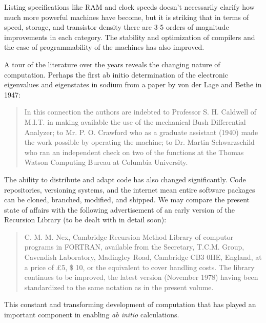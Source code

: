 Listing specifications like RAM and clock speeds doesn't necessarily clarify 
how much more powerful machines have become, 
but it is striking that in terms of speed, storage, and transistor density 
there are 3-5 orders of magnitude improvements in each category. 
The stability and optimization of compilers and the ease of programmability
of the machines has also improved.

A tour of the literature over the years reveals the changing nature of computation.
Perhaps the first ab initio determination of the electronic eigenvalues and eigenstates
in sodium from a paper by von der Lage and Bethe in 1947:
%
\begin{quote}
In this connection the authors are indebted to Professor S. H. Caldwell of M.I.T. in making available the
use of the mechanical Bush Differential Analyzer; to Mr. P. O. Crawford who as a graduate assistant (1940)
made the work possible by operating the machine; to Dr. Martin Schwarzschild who ran an independent
check on two of the functions at the Thomas Watson Computing Bureau at Columbia University.
\end{quote}
%


The ability to distribute and adapt code has also changed significantly. 
Code repositories, versioning systems, and the internet mean entire software
packages can be cloned, branched, modified, and shipped. We may compare the
present state of affairs with the following advertisement of an early version
of the Recursion Library (to be dealt with in detail soon):

\begin{quote}
C. M. M. Nex, Cambridge Recursion Method Library of computor
programs in FORTRAN, available from the Secretary, T.C.M. Group,
Cavendish Laboratory, Madingley Road, Cambridge CB3 0HE, England,
at a price of \pounds 5, \$ 10, or the equivalent to cover handling costs.
The library continues to be improved, the latest version
(November 1978) having been standardized to the same notation
as in the present volume.
\end{quote}

This constant and transforming development of computation that 
has played an important component in enabling {\it ab initio} 
calculations. 

